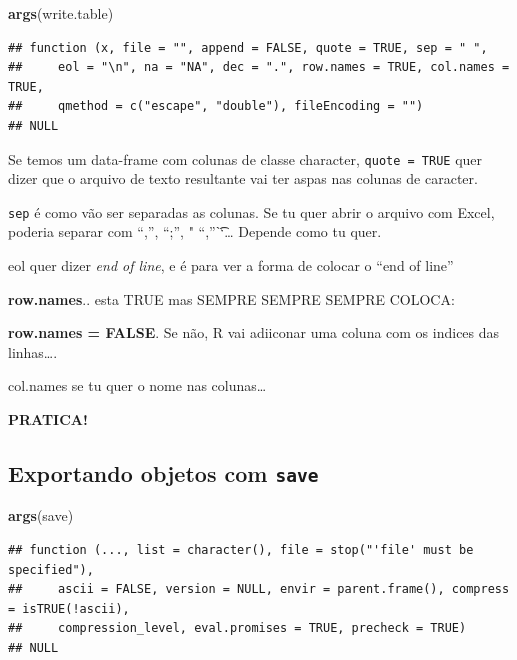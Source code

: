\documentclass[]{book}
\newenvironment{Shaded}{\begin{snugshade}}{\end{snugshade}}
\newcommand{\KeywordTok}[1]{\textcolor[rgb]{0.13,0.29,0.53}{\textbf{#1}}}
\newcommand{\NormalTok}[1]{#1}
\theoremstyle{definition}
\theoremstyle{definition}
\theoremstyle{definition}
\theoremstyle{remark}
\begin{document}
\begin{Shaded}
\begin{Highlighting}[]
\KeywordTok{args}\NormalTok{(write.table)}
\end{Highlighting}
\end{Shaded}

\begin{verbatim}
## function (x, file = "", append = FALSE, quote = TRUE, sep = " ", 
##     eol = "\n", na = "NA", dec = ".", row.names = TRUE, col.names = TRUE, 
##     qmethod = c("escape", "double"), fileEncoding = "") 
## NULL
\end{verbatim}

Se temos um data-frame com colunas de classe character,
\texttt{quote\ =\ TRUE} quer dizer que o arquivo de texto resultante vai
ter aspas nas colunas de caracter.

\texttt{sep} é como vão ser separadas as colunas. Se tu quer abrir o
arquivo com Excel, poderia separar com ``,'', ``;'', " ``,''\t``\ldots{}
Depende como tu quer.

eol quer dizer \emph{end of line}, e é para ver a forma de colocar o
``end of line''

\textbf{row.names}.. esta TRUE mas SEMPRE SEMPRE SEMPRE COLOCA:

\textbf{row.names = FALSE}. Se não, R vai adiiconar uma coluna com os
indices das linhas\ldots{}.

col.names se tu quer o nome nas colunas\ldots{}

\textbf{PRATICA!}

\subsection{\texorpdfstring{Exportando objetos com
\texttt{save}}{Exportando objetos com save}}\label{exportando-objetos-com-save}

\begin{Shaded}
\begin{Highlighting}[]
\KeywordTok{args}\NormalTok{(save)}
\end{Highlighting}
\end{Shaded}

\begin{verbatim}
## function (..., list = character(), file = stop("'file' must be specified"), 
##     ascii = FALSE, version = NULL, envir = parent.frame(), compress = isTRUE(!ascii), 
##     compression_level, eval.promises = TRUE, precheck = TRUE) 
## NULL
\end{verbatim}
\end{document}
